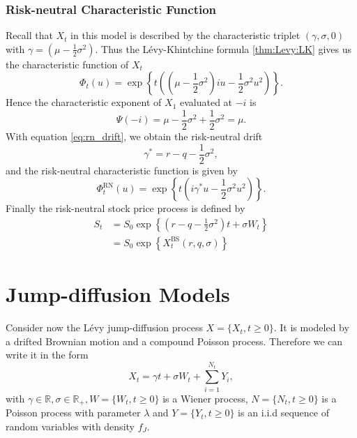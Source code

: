 \subsubsection*{Risk-neutral Characteristic Function}
Recall that $X_t$ in this model is described by the characteristic triplet $(\gamma, \sigma, 0)$ with $\gamma=\left(\mu-\frac{1}{2}\sigma^2\right)$. Thus the L\'evy-Khintchine formula \ref{thm:Levy:LK} gives us the characteristic function of $X_t$
$$\Phi_t(u)= \exp\left\{t\left(\left(\mu-\frac{1}{2}\sigma^2\right)iu -\frac{1}{2}\sigma^2 u^2\right)\right\}.$$
Hence the characteristic exponent of $X_1$ evaluated at $-i$ is
$$ \Psi(-i) = \mu -\frac{1}{2}\sigma^2+\frac{1}{2}\sigma^2 =\mu .$$
With equation \eqref{eq:rn_drift}, we obtain the risk-neutral drift
$$\gamma^\ast = r-q-\frac{1}{2}\sigma^2,$$
and the risk-neutral characteristic function is given by
$$\Phi_t^{\text{RN}}(u) = \exp\left\{t\left(i\gamma^\ast u -\frac{1}{2}\sigma^2u^2\right)\right\}.$$
Finally the risk-neutral stock price process is defined by
\begin{align*}
S_t&=S_0\exp\left\{\left(r-q-\frac{1}{2}\sigma^2\right)t+\sigma W_t\right\}\\
&=S_0\exp\left\{X_t^\text{BS}(r,q,\sigma)\right\}
\end{align*}

\section{Jump-diffusion Models}
\label{sec:models:jump_diffusion}

Consider now the L\'evy jump-diffusion process $X=\{X_t,t\geq0\}$. It is modeled by a drifted Brownian motion and a compound Poisson process. Therefore we can write it in the form
$$X_t = \gamma t +\sigma W_t +\sum_{i=1}^{N_t}Y_i,$$
with $\gamma \in \mathbb{R}, \sigma \in \mathbb{R}_+, W = \{W_t,t\geq0\}$ is a Wiener process, $N =\{N_t,t\geq0\}$ is a Poisson process with parameter $\lambda$ and $Y=\{Y_t,t\geq0\}$ is an i.i.d sequence of random variables with density $f_J$.

